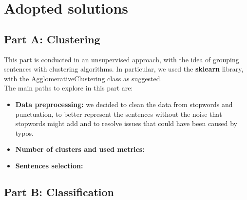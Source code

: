 \section{Adopted solutions}

\subsection*{Part A: Clustering}
This part is conducted in an unsupervised approach, with the idea of grouping sentences with clustering algorithms. In particular, we used the \textbf{sklearn} library, with the AgglomerativeClustering class as suggested.\\
The main paths to explore in this part are:
\begin{itemize}
    \item \textbf{Data preprocessing:} we decided to clean the data from stopwords and punctuation, to better represent the sentences without the noise that stopwords might add and to resolve issues that could have been caused by typos. 
    \item \textbf{Number of clusters and used metrics: } 
    \item \textbf{Sentences selection: }
\end{itemize}

\subsection*{Part B: Classification}